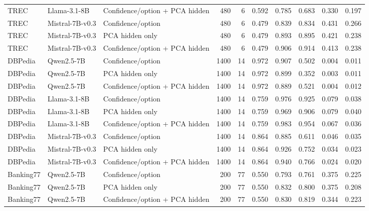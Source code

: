 \begin{table}[t]
\begin{adjustbox}{width=\textwidth}
\begin{tabular}{lllrrrrrrr}
TREC & Llama-3.1-8B & Confidence/option + PCA hidden & 480 & 6 & 0.592 & 0.785 & 0.683 & 0.330 & 0.197 \\
TREC & Mistral-7B-v0.3 & Confidence/option & 480 & 6 & 0.479 & 0.839 & 0.834 & 0.431 & 0.266 \\
TREC & Mistral-7B-v0.3 & PCA hidden only & 480 & 6 & 0.479 & 0.893 & 0.895 & 0.421 & 0.238 \\
TREC & Mistral-7B-v0.3 & Confidence/option + PCA hidden & 480 & 6 & 0.479 & 0.906 & 0.914 & 0.413 & 0.238 \\
DBPedia & Qwen2.5-7B & Confidence/option & 1400 & 14 & 0.972 & 0.907 & 0.502 & 0.004 & 0.011 \\
DBPedia & Qwen2.5-7B & PCA hidden only & 1400 & 14 & 0.972 & 0.899 & 0.352 & 0.003 & 0.011 \\
DBPedia & Qwen2.5-7B & Confidence/option + PCA hidden & 1400 & 14 & 0.972 & 0.889 & 0.521 & 0.004 & 0.012 \\
DBPedia & Llama-3.1-8B & Confidence/option & 1400 & 14 & 0.759 & 0.976 & 0.925 & 0.079 & 0.038 \\
DBPedia & Llama-3.1-8B & PCA hidden only & 1400 & 14 & 0.759 & 0.969 & 0.906 & 0.079 & 0.040 \\
DBPedia & Llama-3.1-8B & Confidence/option + PCA hidden & 1400 & 14 & 0.759 & 0.983 & 0.954 & 0.067 & 0.036 \\
DBPedia & Mistral-7B-v0.3 & Confidence/option & 1400 & 14 & 0.864 & 0.885 & 0.611 & 0.046 & 0.035 \\
DBPedia & Mistral-7B-v0.3 & PCA hidden only & 1400 & 14 & 0.864 & 0.926 & 0.752 & 0.034 & 0.023 \\
DBPedia & Mistral-7B-v0.3 & Confidence/option + PCA hidden & 1400 & 14 & 0.864 & 0.940 & 0.766 & 0.024 & 0.020 \\
Banking77 & Qwen2.5-7B & Confidence/option & 200 & 77 & 0.550 & 0.793 & 0.761 & 0.375 & 0.225 \\
Banking77 & Qwen2.5-7B & PCA hidden only & 200 & 77 & 0.550 & 0.832 & 0.800 & 0.375 & 0.208 \\
Banking77 & Qwen2.5-7B & Confidence/option + PCA hidden & 200 & 77 & 0.550 & 0.830 & 0.819 & 0.344 & 0.223 \\
\bottomrule
\end{tabular}
\end{adjustbox}
\end{table}
